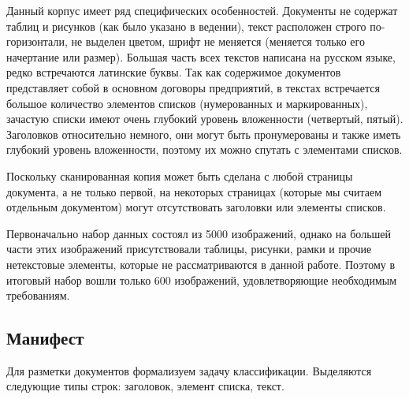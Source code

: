 \documentclass{ProcISPRAS}
\begin{document}
Данный корпус имеет ряд специфических особенностей. Документы не содержат таблиц и рисунков (как было указано в ведении), текст расположен строго по-горизонтали, не выделен цветом, шрифт не меняется (меняется только его начертание или размер). Большая часть всех текстов написана на русском языке, редко встречаются латинские буквы. Так как содержимое документов представляет собой в основном договоры предприятий, в текстах встречается большое количество элементов списков (нумерованных и маркированных), зачастую списки имеют очень глубокий уровень вложенности (четвертый, пятый). Заголовков относительно немного, они могут быть пронумерованы и также иметь глубокий уровень вложенности, поэтому их можно спутать с элементами списков.

Поскольку сканированная копия может быть сделана с любой страницы документа, а не только первой, на некоторых страницах (которые мы считаем отдельным документом) могут отсутствовать заголовки или элементы списков.

Первоначально набор данных состоял из 5000 изображений, однако на большей части этих изображений присутствовали таблицы, рисунки, рамки и прочие нетекстовые элементы, которые не рассматриваются в данной работе. Поэтому в итоговый набор вошли только 600 изображений, удовлетворяющие необходимым требованиям.

\subsection{Манифест}

Для разметки документов формализуем задачу классификации. Выделяются следующие типы строк: заголовок, элемент списка, текст.
\end{document}
